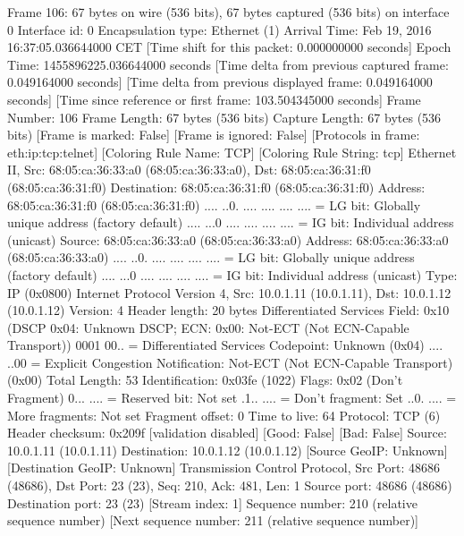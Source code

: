 Frame 106: 67 bytes on wire (536 bits), 67 bytes captured (536 bits) on interface 0
    Interface id: 0
    Encapsulation type: Ethernet (1)
    Arrival Time: Feb 19, 2016 16:37:05.036644000 CET
    [Time shift for this packet: 0.000000000 seconds]
    Epoch Time: 1455896225.036644000 seconds
    [Time delta from previous captured frame: 0.049164000 seconds]
    [Time delta from previous displayed frame: 0.049164000 seconds]
    [Time since reference or first frame: 103.504345000 seconds]
    Frame Number: 106
    Frame Length: 67 bytes (536 bits)
    Capture Length: 67 bytes (536 bits)
    [Frame is marked: False]
    [Frame is ignored: False]
    [Protocols in frame: eth:ip:tcp:telnet]
    [Coloring Rule Name: TCP]
    [Coloring Rule String: tcp]
Ethernet II, Src: 68:05:ca:36:33:a0 (68:05:ca:36:33:a0), Dst: 68:05:ca:36:31:f0 (68:05:ca:36:31:f0)
    Destination: 68:05:ca:36:31:f0 (68:05:ca:36:31:f0)
        Address: 68:05:ca:36:31:f0 (68:05:ca:36:31:f0)
        .... ..0. .... .... .... .... = LG bit: Globally unique address (factory default)
        .... ...0 .... .... .... .... = IG bit: Individual address (unicast)
    Source: 68:05:ca:36:33:a0 (68:05:ca:36:33:a0)
        Address: 68:05:ca:36:33:a0 (68:05:ca:36:33:a0)
        .... ..0. .... .... .... .... = LG bit: Globally unique address (factory default)
        .... ...0 .... .... .... .... = IG bit: Individual address (unicast)
    Type: IP (0x0800)
Internet Protocol Version 4, Src: 10.0.1.11 (10.0.1.11), Dst: 10.0.1.12 (10.0.1.12)
    Version: 4
    Header length: 20 bytes
    Differentiated Services Field: 0x10 (DSCP 0x04: Unknown DSCP; ECN: 0x00: Not-ECT (Not ECN-Capable Transport))
        0001 00.. = Differentiated Services Codepoint: Unknown (0x04)
        .... ..00 = Explicit Congestion Notification: Not-ECT (Not ECN-Capable Transport) (0x00)
    Total Length: 53
    Identification: 0x03fe (1022)
    Flags: 0x02 (Don't Fragment)
        0... .... = Reserved bit: Not set
        .1.. .... = Don't fragment: Set
        ..0. .... = More fragments: Not set
    Fragment offset: 0
    Time to live: 64
    Protocol: TCP (6)
    Header checksum: 0x209f [validation disabled]
        [Good: False]
        [Bad: False]
    Source: 10.0.1.11 (10.0.1.11)
    Destination: 10.0.1.12 (10.0.1.12)
    [Source GeoIP: Unknown]
    [Destination GeoIP: Unknown]
Transmission Control Protocol, Src Port: 48686 (48686), Dst Port: 23 (23), Seq: 210, Ack: 481, Len: 1
    Source port: 48686 (48686)
    Destination port: 23 (23)
    [Stream index: 1]
    Sequence number: 210    (relative sequence number)
    [Next sequence number: 211    (relative sequence number)]
